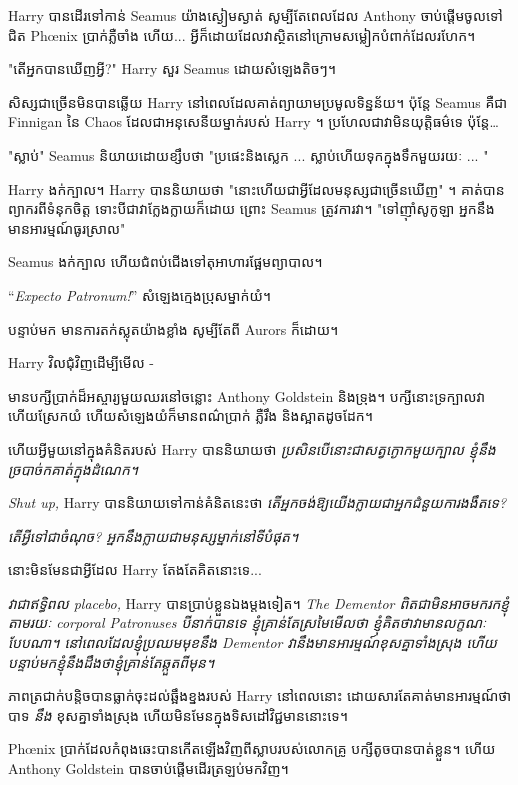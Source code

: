 Harry បានដើរទៅកាន់ Seamus យ៉ាងស្ងៀមស្ងាត់ សូម្បីតែពេលដែល Anthony ចាប់ផ្តើមចូលទៅជិត Phœnix ប្រាក់ភ្លឺចាំង ហើយ... អ្វីក៏ដោយដែលវាស្ថិតនៅក្រោមសម្លៀកបំពាក់ដែលរហែក។

"តើអ្នកបានឃើញអ្វី?" Harry សួរ Seamus ដោយសំឡេងតិចៗ។

សិស្សជាច្រើនមិនបានឆ្លើយ Harry នៅពេលដែលគាត់ព្យាយាមប្រមូលទិន្នន័យ។ ប៉ុន្តែ Seamus គឺជា Finnigan នៃ Chaos ដែលជាអនុសេនីយម្នាក់របស់ Harry ។ ប្រហែលជាវាមិនយុត្តិធម៌ទេ ប៉ុន្តែ…

"ស្លាប់" Seamus និយាយដោយខ្សឹបថា "ប្រផេះនិងស្លេក ... ស្លាប់ហើយទុកក្នុងទឹកមួយរយៈ ... "

Harry ងក់ក្បាល។ Harry បាននិយាយថា "នោះហើយជាអ្វីដែលមនុស្សជាច្រើនឃើញ" ។ គាត់​បាន​ព្យាករ​ពី​ទំនុក​ចិត្ត ទោះ​បី​ជា​វា​ក្លែងក្លាយ​ក៏​ដោយ ព្រោះ Seamus ត្រូវ​ការ​វា។ "ទៅញ៉ាំសូកូឡា អ្នកនឹងមានអារម្មណ៍ធូរស្រាល"

Seamus ងក់ក្បាល ហើយជំពប់ជើងទៅតុអាហារផ្អែមព្យាបាល។

“\emph{Expecto Patronum!}” សំឡេងក្មេងប្រុសម្នាក់យំ។

បន្ទាប់មក មានការតក់ស្លុតយ៉ាងខ្លាំង សូម្បីតែពី Aurors ក៏ដោយ។

Harry វិលជុំវិញដើម្បីមើល -

មានបក្សីប្រាក់ដ៏អស្ចារ្យមួយឈរនៅចន្លោះ Anthony Goldstein និងទ្រុង។ បក្សី​នោះ​ទ្រ​ក្បាល​វា​ហើយ​ស្រែក​យំ ហើយ​សំឡេង​យំ​ក៏​មាន​ពណ៌​ប្រាក់ ភ្លឺ​រឹង និង​ស្អាត​ដូច​ដែក។

ហើយអ្វីមួយនៅក្នុងគំនិតរបស់ Harry បាននិយាយថា \emph{ប្រសិនបើនោះជាសត្វក្ងោកមួយក្បាល ខ្ញុំនឹងច្របាច់កគាត់ក្នុងដំណេក។}

\emph{Shut up,} Harry បាននិយាយទៅកាន់គំនិតនេះថា \emph{តើអ្នកចង់ឱ្យយើងក្លាយជាអ្នកជំនួយការងងឹតទេ?}

\emph{តើអ្វីទៅជាចំណុច? អ្នក​នឹង​ក្លាយ​ជា​មនុស្ស​ម្នាក់​នៅ​ទី​បំផុត​។}

នោះមិនមែនជាអ្វីដែល Harry តែងតែគិតនោះទេ...

\emph{វាជាឥទ្ធិពល placebo,} Harry បានប្រាប់ខ្លួនឯងម្តងទៀត។ \emph{ The Dementor ពិតជាមិនអាចមករកខ្ញុំតាមរយៈ corporal Patronuses បីនាក់បានទេ ខ្ញុំគ្រាន់តែស្រមៃមើលថា ខ្ញុំគិតថាវាមានលក្ខណៈបែបណា។ នៅពេលដែលខ្ញុំប្រឈមមុខនឹង Dementor វានឹងមានអារម្មណ៍ខុសគ្នាទាំងស្រុង ហើយបន្ទាប់មកខ្ញុំនឹងដឹងថាខ្ញុំគ្រាន់តែឆ្កួតពីមុន។}

ភាពត្រជាក់បន្តិចបានធ្លាក់ចុះដល់ឆ្អឹងខ្នងរបស់ Harry នៅពេលនោះ ដោយសារតែគាត់មានអារម្មណ៍ថា បាទ \emph{នឹង} ខុសគ្នាទាំងស្រុង ហើយមិនមែនក្នុងទិសដៅវិជ្ជមាននោះទេ។

Phœnix ប្រាក់​ដែល​កំពុង​ឆេះ​បាន​កើត​ឡើង​វិញ​ពី​ស្លាប​របស់​លោក​គ្រូ បក្សី​តូច​បាន​បាត់​ខ្លួន។ ហើយ Anthony Goldstein បានចាប់ផ្តើមដើរត្រឡប់មកវិញ។

